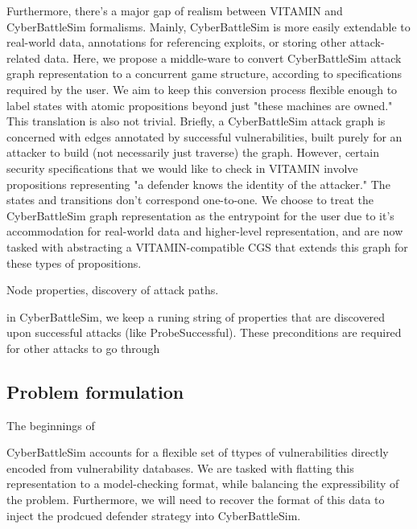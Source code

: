 Furthermore, there's a major gap of realism between VITAMIN and CyberBattleSim formalisms. Mainly, CyberBattleSim is more easily extendable to real-world data, annotations for referencing exploits, or storing other attack-related data. Here, we propose a middle-ware to convert CyberBattleSim attack graph representation to a concurrent game structure, according to specifications required by the user. We aim to keep this conversion process flexible enough to label states with atomic propositions beyond just "these machines are owned." This translation is also not trivial. Briefly, a CyberBattleSim attack graph is concerned with edges annotated by successful vulnerabilities, built purely for an attacker to build (not necessarily just traverse) the graph. However, certain security specifications that we would like to check in VITAMIN involve propositions representing "a defender knows the identity of the attacker." The states and transitions don't correspond one-to-one. We choose to treat the CyberBattleSim graph representation as the entrypoint for the user due to it's accommodation for real-world data and higher-level representation, and are now tasked with abstracting a VITAMIN-compatible CGS that extends this graph for these types of propositions.

Node properties, discovery of attack paths. 

in CyberBattleSim, we keep a runing string of properties that are discovered upon successful attacks (like ProbeSuccessful). These preconditions are required for other attacks to go through


\subsection{Problem formulation}

The beginnings of 

CyberBattleSim accounts for a flexible set of ttypes of vulnerabilities directly encoded from vulnerability databases. We are tasked with flatting this representation to a model-checking format, while balancing the expressibility of the problem. Furthermore, we will need to recover the format of this data to inject the prodcued defender strategy into CyberBattleSim. 
